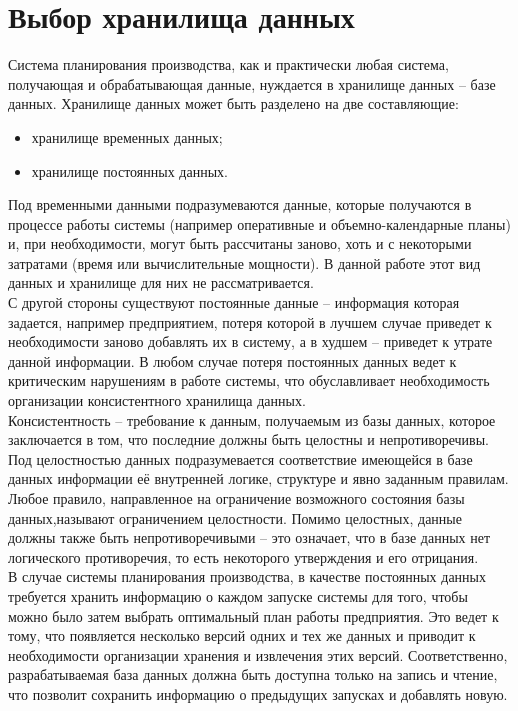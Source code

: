 
\section{Выбор хранилища данных}\label{sec:choose}
\indent Система планирования производства, как и практически любая система, получающая и обрабатывающая данные, нуждается в хранилище данных -- базе данных.
Хранилище данных может быть разделено на две составляющие:
\begin{itemize}
	\item хранилище временных данных;
	\item хранилище постоянных данных.
\end{itemize}

\indent Под временными данными подразумеваются данные, которые получаются в процессе работы системы (например оперативные и объемно-календарные планы) и, при необходимости, могут быть рассчитаны заново, хоть и с некоторыми затратами (время или вычислительные мощности).
В данной работе этот вид данных и хранилище для них не рассматривается.\\
\indent С другой стороны существуют постоянные данные -- информация которая задается, например предприятием, потеря которой в лучшем случае приведет к необходимости заново добавлять их в систему, а в худшем -- приведет к утрате данной информации.
В любом случае потеря постоянных данных ведет к критическим нарушениям в работе системы, что обуславливает необходимость организации консистентного хранилища данных.\\
\indent Консистентность -- требование к данным, получаемым из базы данных, которое заключается в том, что последние должны быть целостны и непротиворечивы.
Под целостностью данных подразумевается соответствие имеющейся в базе данных информации её внутренней логике, структуре и явно заданным правилам.
Любое правило, направленное на ограничение возможного состояния базы данных,называют ограничением целостности.
Помимо целостных, данные должны также быть непротиворечивыми -- это означает, что в базе данных нет логического противоречия, то есть некоторого утверждения и его отрицания.\\
\indent В случае системы планирования производства, в качестве постоянных данных требуется хранить информацию о каждом запуске системы для того, чтобы можно было затем выбрать оптимальный план работы предприятия.
Это ведет к тому, что появляется несколько версий одних и тех же данных и приводит к необходимости организации хранения и извлечения этих версий.
Соответственно, разрабатываемая база данных должна быть доступна только на запись и чтение, что позволит сохранить информацию о предыдущих запусках и добавлять новую.\\
